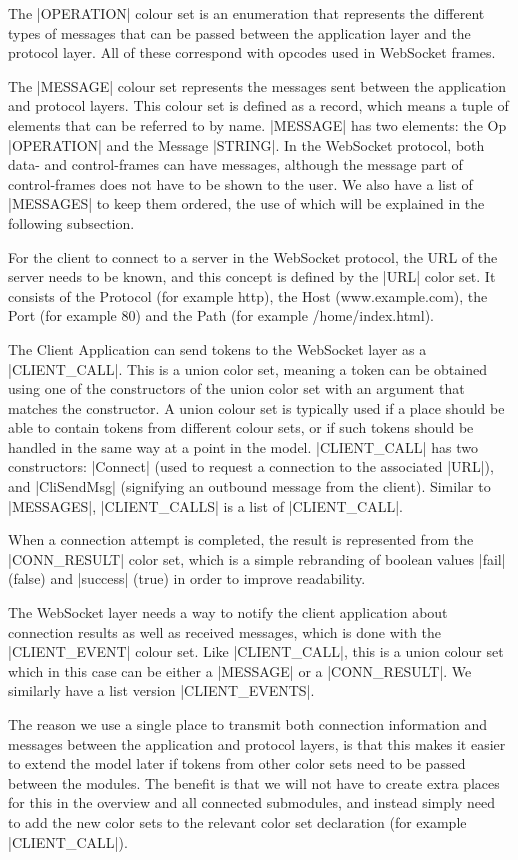 	The |OPERATION| colour set is an enumeration that represents the
	different types of messages that can be passed between the application layer
	and the protocol layer. All of these correspond with opcodes used in WebSocket
	frames.
	
	The |MESSAGE| colour set represents the messages sent between the
	application and protocol layers. This colour set is defined as a record,
	which means a tuple of elements that can be referred to by name. |MESSAGE| has two
	elements: the Op |OPERATION| and the Message |STRING|. In the WebSocket
	protocol, both data- and control-frames can have messages, although the message
	part of control-frames does not have to be shown to the user. We also have a
	list of |MESSAGES| to keep them ordered, the use of which will be explained in
	the following subsection. 
	
	For the client to connect to a server in the WebSocket protocol, the URL
	of the server needs to be known, and this concept is defined by the |URL| color
	set. It consists of the Protocol (for example http), the Host
	(www.example.com), the Port (for example 80) and the Path (for example
	/home/index.html).
	
	The Client Application can send tokens to the WebSocket layer as a
	|CLIENT_CALL|. This is a union color set, meaning a token can be obtained
	using one of the constructors of the union color set with an argument that
	matches the constructor. A union colour set is typically used if a place should
	be able to contain tokens from different colour sets, or if such tokens should
	be handled in the same way at a  point in the model. |CLIENT_CALL| has two
	constructors: |Connect| (used to request a connection to the associated |URL|),
	and |CliSendMsg| (signifying an outbound message from the client). Similar
	to |MESSAGES|, |CLIENT_CALLS| is a list of |CLIENT_CALL|.
	
	When a connection attempt is completed, the result is represented from the
	|CONN_RESULT| color set, which is a simple rebranding of boolean values
	|fail| (false) and |success| (true) in order to improve readability.
	
	The WebSocket layer needs a way to notify the client application about 
	connection results as well as received messages, which is done with the
	|CLIENT_EVENT| colour set. Like |CLIENT_CALL|, this is a union colour set which
	in this case can be either a |MESSAGE| or a |CONN_RESULT|. We similarly
	have a list version |CLIENT_EVENTS|.
	
	
	The reason we use a single place to transmit both connection information and
	messages between the application and protocol layers, is that this makes it
	easier to extend the model later if tokens from other color sets need to be passed
	between the modules. The benefit is that we will not have to create extra places for
	this in the overview and all connected submodules, and instead simply need to
	add the new color sets to the relevant color set declaration (for example
	|CLIENT_CALL|).
	
